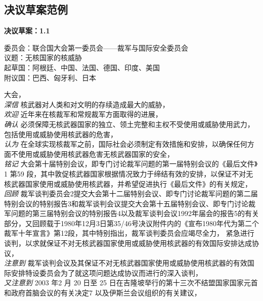 \documentclass[a4paper,openany]{book}
\begin{document}
\newpage

\subsection{决议草案范例}
\begin{spacing}{1}
\setlength{\parskip}{0em}

\centerline{\textbf{\large 决议草案：1.1}}

\vspace{1em}

\noindent 委员会：联合国大会第一委员会——裁军与国际安全委员会 \\
\noindent 议题：无核国家的核威胁 \\
\noindent 起草国：阿根廷、中国、法国、德国、印度、美国 \\
\noindent 附议国：巴西、匈牙利、日本

\vspace{1em}

\noindent 大会，\\
\indent \textit{深信} 核武器对人类和对文明的存续造成最大的威胁， \\
\indent \textit{欢迎} 近年来在核裁军和常规裁军方面取得的进展， \\
\indent \textit{确认} 必须保障无核武器国家的独立、领土完整和主权不受使用或威胁使用武力，包括使用或威胁使用核武器的危害， \\
\indent \textit{认为} 在全球实现核裁军之前，国际社会必须制定有效措施和安排，以确保任何方面不使用或威胁使用核武器危害无核武器国家的安全，\\
\indent \textit{铭记} 大会第十届特别会议，即专门讨论裁军问题的第一届特别会议的《最后文件》1 第59 段，其中敦促核武器国家根据情况致力于缔结有效的安排，以保证不对无核武器国家使用或威胁使用核武器，并希望促进执行《最后文件》的有关规定，\\
\indent \textit{回顾} 裁军谈判委员会2提交大会第十二届特别会议、即专门讨论裁军问题的第二届特别会议的特别报告3和裁军谈判会议提交大会第十五届特别会议、即专门讨论裁军问题的第三届特别会议的特别报告4以及裁军谈判会议1992年届会的报告5的有关部分，又回顾载于1980年12月3日第35/46号决议附件内的《宣布1980年代为第二个裁军十年宣言》第12段，其中特别指出，裁军谈判委员会应竭尽全力， 紧急进行谈判，以求就保证不对无核武器国家使用或威胁使用核武器的有效国际安排达成协议， \\
\indent \textit{注意到} 裁军谈判会议及其保证不对无核武器国家使用或威胁使用核武器的有效国际安排特设委员会为了就这项问题达成协议而进行的深入谈判， \\
\indent \textit{又注意到} 2003 年2 月 20 日至 25 日在吉隆坡举行的第十三次不结盟国家国家元首和政府首脑会议的有关决定7 以及伊斯兰会议组织的有关建议， 


\end{spacing}
\end{document}
